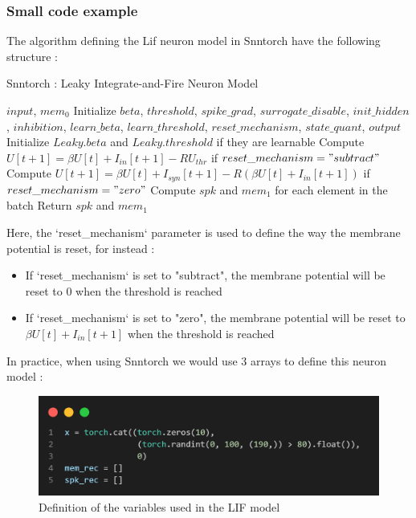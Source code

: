 \documentclass[11pt]{article}
\begin{document}
\subsubsection*{Small code example}
The algorithm defining the Lif neuron model in Snntorch have the following structure :
\begin{algorithm}[H]
  \caption{Snntorch : Leaky Integrate-and-Fire Neuron Model}
  \begin{algorithmic}[1]
    \Require $input$, $mem_0$
    \State Initialize $beta$, $threshold$, $spike\_grad$, $surrogate\_disable$, $init\_hidden$, $inhibition$, $learn\_beta$, $learn\_threshold$, $reset\_mechanism$, $state\_quant$, $output$
    \State Initialize $Leaky.beta$ and $Leaky.threshold$ if they are learnable
    \EndIf
    \State Compute $U[t+1] = \beta U[t] + I_{in}[t+1] - RU_{thr}$ if $reset\_mechanism = "subtract"$
    \State Compute $U[t+1] = \beta U[t] + I_{syn}[t+1] - R(\beta U[t] + I_{in}[t+1])$ if $reset\_mechanism = "zero"$
    \State Compute $spk$ and $mem_1$ for each element in the batch
    \State Return $spk$ and $mem_1$
    \EndFor
  \end{algorithmic}
\end{algorithm}

Here, the `reset\_mechanism` parameter is used to define the way the membrane potential is reset, for instead : 
\begin{itemize}
  \item If `reset\_mechanism` is set to "subtract", the membrane potential will be reset to $0$ when the threshold is reached 
  \item If `reset\_mechanism` is set to "zero", the membrane potential will be reset to $\beta U[t] + I_{in}[t+1]$ when the threshold is reached
\end{itemize}

In practice, when using Snntorch we would use 3 arrays to define this neuron model : 

\begin{figure}[H]
  \begin{center}
    \includegraphics[width=\textwidth]{image/def_vars.png}
    \caption{Definition of the variables used in the LIF model}
    \label{fig:def_vars}
  \end{center}
\end{figure}
\end{document}
